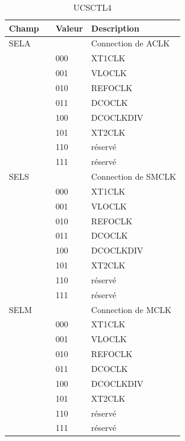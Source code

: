 \begin{table}[H]
\centering 
\begin{tabular}{l l l l}
\hline\hline
Champ & & Valeur & Description \\ %
\hline
SELA & & & Connection de ACLK  \\
& & 000 & XT1CLK \\
& & 001 & VLOCLK \\
& & 010 & REFOCLK \\
& & 011 & DCOCLK \\
& & 100 & DCOCLKDIV \\
& & 101 & XT2CLK \\
& & 110 & réservé \\
& & 111 & réservé \\
\hline
SELS & & & Connection de SMCLK  \\
& & 000 & XT1CLK \\
& & 001 & VLOCLK \\
& & 010 & REFOCLK \\
& & 011 & DCOCLK \\
& & 100 & DCOCLKDIV \\
& & 101 & XT2CLK \\
& & 110 & réservé \\
& & 111 & réservé \\
\hline
SELM & & & Connection de MCLK  \\
& & 000 & XT1CLK \\
& & 001 & VLOCLK \\
& & 010 & REFOCLK \\
& & 011 & DCOCLK \\
& & 100 & DCOCLKDIV \\
& & 101 & XT2CLK \\
& & 110 & réservé \\
& & 111 & réservé \\
\hline
\end{tabular}
\caption{UCSCTL4}
\label{table:UCSCTL4}
\end{table}

